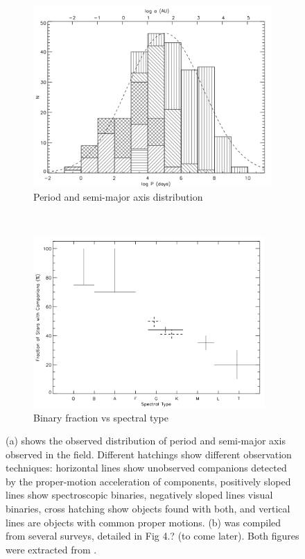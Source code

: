 \begin{figure}
\center
    \centering
    \begin{subfigure}[b]{0.48\textwidth}
    	\centering
        \includegraphics[width=\textwidth]{Figures/0_binperiods.png}
        \caption{Period and semi-major axis distribution}
        \label{Fig:0_binpop_1}
    \end{subfigure}
    ~~
    \begin{subfigure}[b]{0.48\textwidth}
    	\centering
        \includegraphics[width=0.97\textwidth]{Figures/0_binfraction.png}
        \caption{Binary fraction vs spectral type}
        \label{Fig:0_binpop_2}
    \end{subfigure}
\caption{(a) shows the observed distribution of period and semi-major axis observed in the field. Different hatchings show different observation techniques: horizontal lines show unobserved companions detected by the proper-motion acceleration of components, positively sloped lines show spectroscopic binaries, negatively sloped lines visual binaries, cross hatching show objects found with both, and vertical lines are objects with common proper motions. (b) was compiled from several surveys, detailed in Fig 4.? (to come later). Both figures were extracted from \cite{Raghavan2010}. }
\label{Fig:0_binpopulation}
\end{figure}




